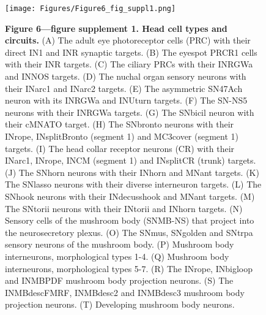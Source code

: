 \documentclass[
  11pt,
]{article}
\begin{document}
\begin{figure}[H]

{\centering \texttt{[image: Figures/Figure6\_fig\_suppl1.png]}

}

\caption{\textbf{Figure 6---figure supplement 1. Head cell types and
circuits. } (A) The adult eye photoreceptor cells (PRC) with their
direct IN1 and INR synaptic targets. (B) The eyespot PRCR1 cells with
their INR targets. (C) The ciliary PRCs with their INRGWa and INNOS
targets. (D) The nuchal organ sensory neurons with their INarc1 and
INarc2 targets. (E) The asymmetric SN47Ach neuron with its INRGWa and
INUturn targets. (F) The SN-NS5 neurons with their INRGWa targets. (G)
The SNbicil neuron with their cMNATO target. (H) The SNbronto neurons
with their INrope, INsplitBronto (segment 1) and MC3cover (segment 1)
targets. (I) The head collar receptor neurons (CR) with their INarc1,
INrope, INCM (segment 1) and INsplitCR (trunk) targets. (J) The SNhorn
neurons with their INhorn and MNant targets. (K) The SNlasso neurons
with their diverse interneuron targets. (L) The SNhook neurons with
their INdecusshook and MNant targets. (M) The SNtorii neurons with their
INtorii and INhorn targets. (N) Sensory cells of the mushroom body
(SNMB-NS) that project into the neurosecretory plexus. (O) The SNmus,
SNgolden and SNtrpa sensory neurons of the mushroom body. (P) Mushroom
body interneurons, morphological types 1-4. (Q) Mushroom body
interneurons, morphological types 5-7. (R) The INrope, INbigloop and
INMBPDF mushroom body projection neurons. (S) The INMBdescFMRF,
INMBdesc2 and INMBdesc3 mushroom body projection neurons. (T) Developing
mushroom body neurons.}

\end{figure}%
\end{document}

